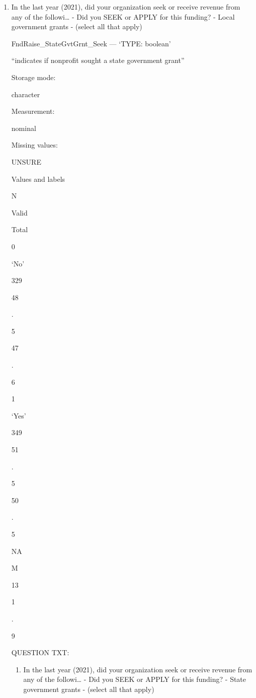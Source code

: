 \documentclass[
  letterpaper,
]{scrbook}
\providecommand{\tightlist}{%
  \setlength{\itemsep}{0pt}\setlength{\parskip}{0pt}}\usepackage{longtable,booktabs,array}
\begin{document}
\begin{enumerate}
\def\labelenumi{\arabic{enumi}.}
\setcounter{enumi}{8}
\tightlist
\item
  In the last year (2021), did your organization seek or receive revenue
  from any of the followi\ldots{} - Did you SEEK or APPLY for this
  funding? - Local government grants - (select all that apply)

  FndRaise\_StateGvtGrnt\_Seek --- {`TYPE: boolean'}

  ``indicates if nonprofit sought a state government grant''

  Storage mode:

  character

  Measurement:

  nominal

  Missing values:

  UNSURE

  Values and labels

  N

  Valid

  Total

  0

  `No'

  329

  48

  .

  5

  47

  .

  6

  1

  `Yes'

  349

  51

  .

  5

  50

  .

  5

  NA

  M

  13

  1

  .

  9

  QUESTION TXT:

  \begin{enumerate}
  \def\labelenumii{\arabic{enumii}.}
  \setcounter{enumii}{8}
  \tightlist
  \item
    In the last year (2021), did your organization seek or receive
    revenue from any of the followi\ldots{} - Did you SEEK or APPLY for
    this funding? - State government grants - (select all that apply)


\end{enumerate}
\end{enumerate}
\end{document}
